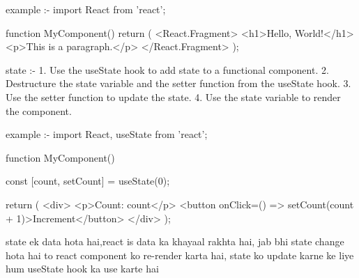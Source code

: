 example :-
import React from 'react';

function MyComponent() {
  return (
    <React.Fragment>
      <h1>Hello, World!</h1>
      <p>This is a paragraph.</p>
    </React.Fragment>
  );
}

state :-
1. Use the useState hook to add state to a functional component.
2. Destructure the state variable and the setter function from the useState hook.
3. Use the setter function to update the state.
4. Use the state variable to render the component.

example :-
import React, { useState } from 'react';

function MyComponent() {
  const [count, setCount] = useState(0);

  return (
    <div>
      <p>Count: {count}</p>
      <button onClick={() => setCount(count + 1)}>Increment</button>
    </div>
  );
}

state ek data hota hai,react is data ka khayaal rakhta hai, jab bhi state change hota hai to react component ko re-render karta hai, state ko update karne ke liye hum useState hook ka use karte hai 